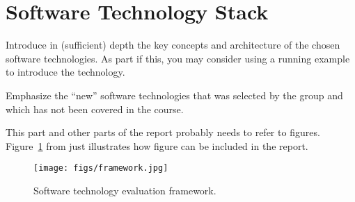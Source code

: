 \section{Software Technology Stack}
\label{sec:technology}

Introduce in (sufficient) depth the key concepts and architecture of the chosen software technologies. As part if this, you may consider using a running example to introduce the technology.

Emphasize the “new” software technologies that was selected by the group and which has not been covered in the course.

This part and other parts of the report probably needs to refer to
figures. Figure~\ref{fig:framework} from \cite{brown:96} just
illustrates how figure can be included in the report.

\begin{figure}
  \centering
  \texttt{[image: figs/framework.jpg]}
  \caption{Software technology evaluation framework.}
  \label{fig:framework}
\end{figure}
